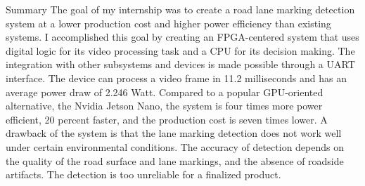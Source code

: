 \documentclass{matthijs}
\begin{document}
\begin{hoofdstuk*}{Summary}
		The goal of my internship was to create a road lane marking detection system at a lower production cost and higher power efficiency than existing systems.
		I accomplished this goal by creating an FPGA-centered system that uses digital logic for its video processing task and a CPU for its decision making.
		The integration with other subsystems and devices is made possible through a UART interface.
		The device can process a video frame in 11.2 milliseconds and has an average power draw of 2.246 Watt.
		Compared to a popular GPU-oriented alternative, the Nvidia Jetson Nano, the system is four times more power efficient, 20 percent faster, and the production cost is seven times lower.
		A drawback of the system is that the lane marking detection does not work well under certain environmental conditions.
		The accuracy of detection depends on the quality of the road surface and lane markings, and the absence of roadside artifacts.
		The detection is too unreliable for a finalized product.

	\end{hoofdstuk*}

	\thispagestyle{empty}
	\begin{inhoudspagina}

	\end{inhoudspagina}

\end{document}
